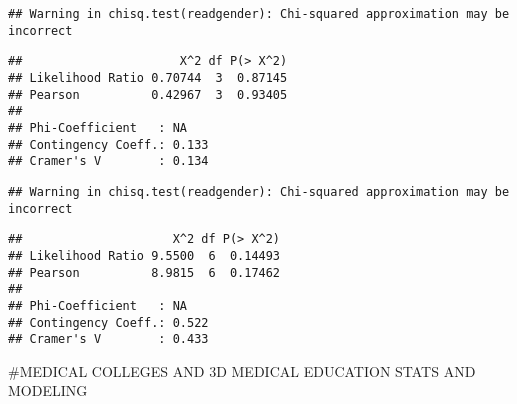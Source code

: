 \documentclass[]{article}
\newenvironment{Shaded}{\begin{snugshade}}{\end{snugshade}}
\newcommand{\DataTypeTok}[1]{\textcolor[rgb]{0.13,0.29,0.53}{#1}}
\newcommand{\KeywordTok}[1]{\textcolor[rgb]{0.13,0.29,0.53}{\textbf{#1}}}
\newcommand{\NormalTok}[1]{#1}
\newcommand{\OperatorTok}[1]{\textcolor[rgb]{0.81,0.36,0.00}{\textbf{#1}}}
\newcommand{\StringTok}[1]{\textcolor[rgb]{0.31,0.60,0.02}{#1}}
\begin{document}
\begin{Shaded}
\end{Shaded}

\begin{verbatim}
## Warning in chisq.test(readgender): Chi-squared approximation may be incorrect
\end{verbatim}

\begin{verbatim}
##                      X^2 df P(> X^2)
## Likelihood Ratio 0.70744  3  0.87145
## Pearson          0.42967  3  0.93405
## 
## Phi-Coefficient   : NA 
## Contingency Coeff.: 0.133 
## Cramer's V        : 0.134
\end{verbatim}

\begin{Shaded}
\end{Shaded}

\begin{verbatim}
## Warning in chisq.test(readgender): Chi-squared approximation may be incorrect
\end{verbatim}

\begin{verbatim}
##                     X^2 df P(> X^2)
## Likelihood Ratio 9.5500  6  0.14493
## Pearson          8.9815  6  0.17462
## 
## Phi-Coefficient   : NA 
## Contingency Coeff.: 0.522 
## Cramer's V        : 0.433
\end{verbatim}

\#MEDICAL COLLEGES AND 3D MEDICAL EDUCATION STATS AND MODELING

\begin{Shaded}
\end{Shaded}
\end{document}
